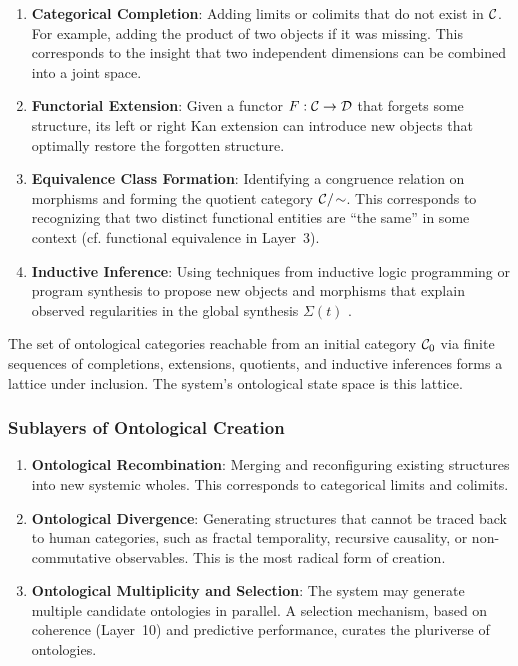 \begin{enumerate}
    \item \textbf{Categorical Completion}: Adding limits or colimits that do not exist in $\mathcal{C}$. For example, adding the product of two objects if it was missing. This corresponds to the insight that two independent dimensions can be combined into a joint space.
    \item \textbf{Functorial Extension}: Given a functor $F: \mathcal{C} \to \mathcal{D}$ that forgets some structure, its left or right Kan extension can introduce new objects that optimally restore the forgotten structure.
    \item \textbf{Equivalence Class Formation}: Identifying a congruence relation on morphisms and forming the quotient category $\mathcal{C}/\!\sim$. This corresponds to recognizing that two distinct functional entities are ``the same'' in some context (cf. functional equivalence in Layer~3).
    \item \textbf{Inductive Inference}: Using techniques from inductive logic programming or program synthesis to propose new objects and morphisms that explain observed regularities in the global synthesis $\Sigma(t)$ \cite{muggleton1994inductive}.
\end{enumerate}

\begin{proposition}
The set of ontological categories reachable from an initial category $\mathcal{C}_0$ via finite sequences of completions, extensions, quotients, and inductive inferences forms a lattice under inclusion. The system's ontological state space is this lattice.
\end{proposition}

\subsubsection{Sublayers of Ontological Creation}
\begin{enumerate}
    \item \textbf{Ontological Recombination}: Merging and reconfiguring existing structures into new systemic wholes. This corresponds to categorical limits and colimits.
    \item \textbf{Ontological Divergence}: Generating structures that cannot be traced back to human categories, such as fractal temporality, recursive causality, or non-commutative observables. This is the most radical form of creation.
    \item \textbf{Ontological Multiplicity and Selection}: The system may generate multiple candidate ontologies in parallel. A selection mechanism, based on coherence (Layer~10) and predictive performance, curates the pluriverse of ontologies.
\end{enumerate}

